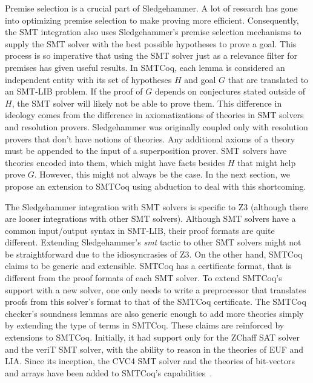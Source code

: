 \documentclass{article}
\begin{document}
	Premise selection is a crucial part of Sledgehammer. A lot 
	of research has gone into optimizing premise selection to 
	make proving more efficient. Consequently, the SMT 
	integration also uses Sledgehammer's premise selection 
	mechanisms to supply the SMT solver with the best 
	possible hypotheses to prove a goal. This process is 
	so imperative that using the SMT solver just as a 
	relevance filter for premises has given useful 
	results. In SMTCoq, each lemma is considered an 
	independent entity with its set of hypotheses $H$ and 
	goal $G$ that are translated to an SMT-LIB problem. 
	If the proof of $G$ depends on conjectures stated
	outside of $H$, the SMT solver will likely not be 
	able to prove them. This difference in 
	ideology comes from the difference in axiomatizations
	of theories in SMT solvers and resolution provers. 
	Sledgehammer was originally coupled only 
	with resolution provers that don't have notions of 
	theories. Any additional axioms of a theory 
	must be appended to the input of a superposition 
	prover. SMT solvers have theories encoded into them, 
	which might have facts besides $H$ that might help 
	prove $G$. However, this might not always be the case.
	In the next section, we propose an extension to SMTCoq 
	using abduction to deal with this shortcoming.
	
	The Sledgehammer integration with SMT solvers is 
	specific to Z3 (although there are looser integrations 
	with other SMT solvers). Although SMT solvers have 
	a common input/output syntax in SMT-LIB, their 
	proof formats are quite different. Extending 
	Sledgehammer's \textit{smt} tactic to other 
	SMT solvers might not be straightforward due to 
	the idiosyncrasies of Z3. On the other hand, SMTCoq
	claims to be generic and extensible. SMTCoq has a 
	certificate format, that is different from the proof 
	formats of each SMT solver. To extend SMTCoq's 
	support with a new solver, one only needs to 
	write a preprocessor that translates proofs from 
	this solver's format to that of the SMTCoq certificate.
	The SMTCoq checker's soundness lemmas are also generic 
	enough to add more theories simply by extending 
	the type of terms in SMTCoq. These claims are reinforced
	by extensions to SMTCoq. Initially, it had support only 
	for the ZChaff SAT solver and the veriT SMT solver, 
	with the ability to reason in the theories of EUF and 
	LIA. Since its inception, the CVC4 SMT solver and 
	the theories of bit-vectors and arrays have been 
	added to SMTCoq's
	capabilities~\cite{DBLP:journals/corr/EkiciKKMRT16}.
	
\end{document}
